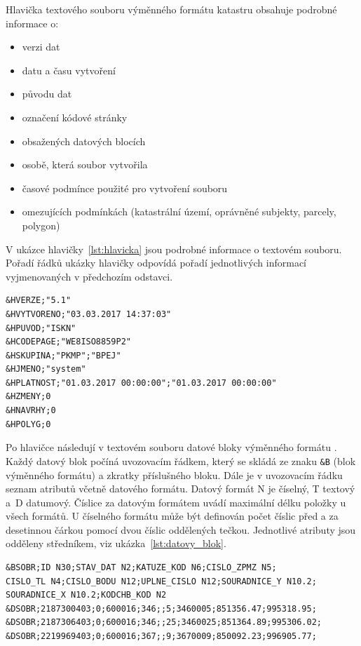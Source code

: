 Hlavička textového souboru výměnného formátu katastru obsahuje podrobné informace o:
\begin{itemize}[leftmargin=50pt]
		\item verzi dat
		\item datu a času vytvoření
		\item původu dat
		\item označení kódové stránky
		\item obsažených datových blocích
		\item osobě, která soubor vytvořila
		\item časové podmínce použité pro vytvoření souboru
		\item omezujících podmínkách (katastrální území, oprávněné subjekty, parcely, polygon)
\end{itemize}
V ukázce hlavičky~\ref{lst:hlavicka} jsou podrobné informace o
textovém souboru. Pořadí řádků ukázky hlavičky odpovídá
pořadí jednotlivých informací vyjmenovaných v předchozím odstavci.
\begin{lstlisting}[caption=Ukázka hlavičky veřejně poskytovaných dat, label=lst:hlavicka]
&HVERZE;"5.1"
&HVYTVORENO;"03.03.2017 14:37:03"
&HPUVOD;"ISKN"
&HCODEPAGE;"WE8ISO8859P2"
&HSKUPINA;"PKMP";"BPEJ"
&HJMENO;"system"
&HPLATNOST;"01.03.2017 00:00:00";"01.03.2017 00:00:00"
&HZMENY;0
&HNAVRHY;0
&HPOLYG;0
\end{lstlisting}

Po hlavičce následují v textovém souboru  datové bloky
výměnného formátu . Každý datový blok počíná uvozovacím řádkem,
který se skládá ze znaku \verb|&B| (blok výměnného formátu) a zkratky
příslušného bloku. Dále je v uvozovacím řádku seznam atributů včetně
datového formátu. Datový formát N je číselný, T textový a~D
datumový. Číslice za datovým formátem uvádí maximální délku položky u
všech formátů. U číselného formátu může být definován počet číslic
před a za desetinnou čárkou pomocí dvou číslic oddělených
tečkou. Jednotlivé atributy jsou odděleny středníkem, viz
ukázka~\ref{lst:datovy_blok}.

\newpage
{\small
\begin{lstlisting}[caption=Ukázka datového bloku SOBR (souřadnice obrazu bodů polohopisu v mapě) veřejně poskytovaných dat, label=lst:datovy_blok]
&BSOBR;ID N30;STAV_DAT N2;KATUZE_KOD N6;CISLO_ZPMZ N5;
CISLO_TL N4;CISLO_BODU N12;UPLNE_CISLO N12;SOURADNICE_Y N10.2;
SOURADNICE_X N10.2;KODCHB_KOD N2
&DSOBR;2187300403;0;600016;346;;5;3460005;851356.47;995318.95;
&DSOBR;2187306403;0;600016;346;;25;3460025;851364.89;995306.02;
&DSOBR;2219969403;0;600016;367;;9;3670009;850092.23;996905.77;
\end{lstlisting}}

